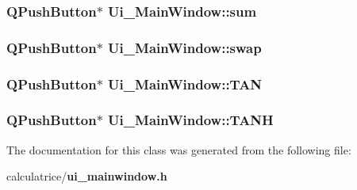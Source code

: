 \subsubsection[{sum}]{\setlength{\rightskip}{0pt plus 5cm}Q\-Push\-Button$\ast$ Ui\-\_\-\-Main\-Window\-::sum}\label{class_ui___main_window_af99377dc93c5c55a8fcb556539ee0b14}
\subsubsection[{swap}]{\setlength{\rightskip}{0pt plus 5cm}Q\-Push\-Button$\ast$ Ui\-\_\-\-Main\-Window\-::swap}\label{class_ui___main_window_a69c4ef9eebd49f9bf048e056f8b3ee84}
\subsubsection[{T\-A\-N}]{\setlength{\rightskip}{0pt plus 5cm}Q\-Push\-Button$\ast$ Ui\-\_\-\-Main\-Window\-::\-T\-A\-N}\label{class_ui___main_window_a17184ec702aa5040677142c4a143e5f2}
\subsubsection[{T\-A\-N\-H}]{\setlength{\rightskip}{0pt plus 5cm}Q\-Push\-Button$\ast$ Ui\-\_\-\-Main\-Window\-::\-T\-A\-N\-H}\label{class_ui___main_window_aa0b74bbccda6715c999c78240332fda0}


The documentation for this class was generated from the following file\-:\begin{DoxyCompactItemize}
\item 
calculatrice/{\bf ui\-\_\-mainwindow.\-h}\end{DoxyCompactItemize}
